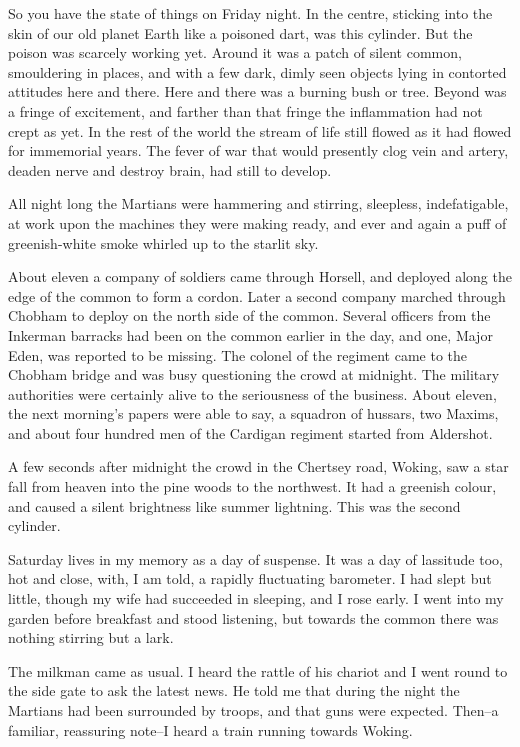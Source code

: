 So you have the state of things on Friday night. In the centre,
sticking into the skin of our old planet Earth like a poisoned
dart, was this cylinder. But the poison was scarcely working yet.
Around it was a patch of silent common, smouldering in places, and
with a few dark, dimly seen objects lying in contorted attitudes
here and there. Here and there was a burning bush or tree. Beyond
was a fringe of excitement, and farther than that fringe the
inflammation had not crept as yet. In the rest of the world the
stream of life still flowed as it had flowed for immemorial years.
The fever of war that would presently clog vein and artery, deaden
nerve and destroy brain, had still to develop.

All night long the Martians were hammering and stirring, sleepless,
indefatigable, at work upon the machines they were making ready,
and ever and again a puff of greenish-white smoke whirled up to the
starlit sky.

About eleven a company of soldiers came through Horsell, and
deployed along the edge of the common to form a cordon. Later a
second company marched through Chobham to deploy on the north side
of the common. Several officers from the Inkerman barracks had been
on the common earlier in the day, and one, Major Eden, was reported
to be missing. The colonel of the regiment came to the Chobham
bridge and was busy questioning the crowd at midnight. The military
authorities were certainly alive to the seriousness of the
business. About eleven, the next morning's papers were able to say,
a squadron of hussars, two Maxims, and about four hundred men of
the Cardigan regiment started from Aldershot.

A few seconds after midnight the crowd in the Chertsey road,
Woking, saw a star fall from heaven into the pine woods to the
northwest. It had a greenish colour, and caused a silent brightness
like summer lightning. This was the second cylinder.

Saturday lives in my memory as a day of suspense. It was a day of
lassitude too, hot and close, with, I am told, a rapidly
fluctuating barometer. I had slept but little, though my wife had
succeeded in sleeping, and I rose early. I went into my garden
before breakfast and stood listening, but towards the common there
was nothing stirring but a lark.

The milkman came as usual. I heard the rattle of his chariot and I
went round to the side gate to ask the latest news. He told me that
during the night the Martians had been surrounded by troops, and
that guns were expected. Then--a familiar, reassuring note--I heard
a train running towards Woking.

